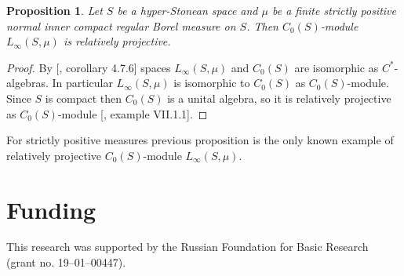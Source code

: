\documentclass[12pt]{article}
\newtheorem{proposition}[theorem]{Proposition}
\begin{document}
\begin{proposition}\label{LInfReProjSuffCond} Let $S$ be a hyper-Stonean space
    and $\mu$ be a finite strictly positive normal inner compact regular Borel
    measure on $S$. Then $C_0(S)$-module $L_\infty(S,\mu)$ is relatively
    projective.
\end{proposition}
\begin{proof} By [\cite{DalesBanSpContFunDualSp}, corollary 4.7.6] spaces
    $L_\infty(S,\mu)$ and $C_0(S)$ are isomorphic as $C^*$-algebras. In
    particular $L_\infty(S,\mu)$ is isomorphic to $C_0(S)$ as $C_0(S)$-module.
    Since $S$ is compact then $C_0(S)$ is a unital algebra, so it is relatively
    projective as $C_0(S)$-module [\cite{HelBanLocConvAlg}, example VII.1.1].
\end{proof}

For strictly positive measures previous proposition is the only known example of
relatively projective $C_0(S)$-module $L_\infty(S,\mu)$.

\section{Funding}\label{SectionFunding} This research was supported by the
Russian Foundation for Basic Research (grant no. 19--01--00447).
\end{document}

